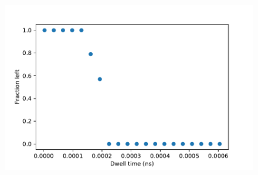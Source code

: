 \documentclass[%
 reprint,
 amsmath,amssymb,
 aps,
10pt
]{revtex4-1}
\begin{document}
 
\begin{figure}[ht]
\begin{center}
\includegraphics[width=1\linewidth]{fraction_left.pdf}
\caption{}
\label{fig:lifetime}
\end{center}
\end{figure}
\end{document}
